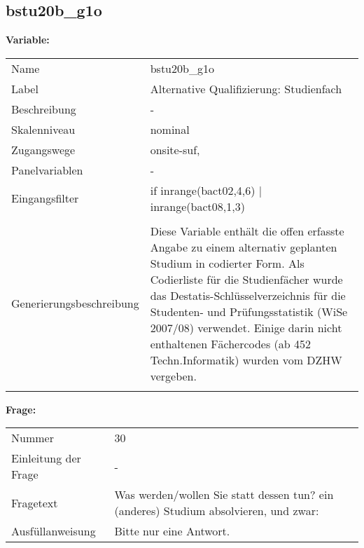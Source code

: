 	
	
	\subsection{bstu20b\_g1o}
	\label{subSection:bstu20b_g1o}

	\noindent\textbf{Variable:}\\
		\begin{tabular}{lL{11.3cm}}
			\label{tableVariable:bstu20b_g1o}
			Name & bstu20b\_g1o \\
			Label & Alternative Qualifizierung: Studienfach \\
			Beschreibung & - \\
			Skalenniveau & nominal \\
			Zugangswege &
				onsite-suf,
 \\
			Panelvariablen & -
			 \\
			Eingangsfilter & if inrange(bact02,4,6) | inrange(bact08,1,3) \\
 \\
					Generierungsbeschreibung & Diese Variable enthält die offen erfasste Angabe zu einem alternativ geplanten Studium in codierter Form. Als Codierliste für die Studienfächer wurde das Destatis-Schlüsselverzeichnis für die Studenten- und Prüfungsstatistik (WiSe 2007/08) verwendet. Einige darin nicht enthaltenen Fächercodes (ab 452 Techn.Informatik) wurden vom DZHW vergeben.
				 \\	
			 \\
		\end{tabular}

		\vspace*{1 cm}
		\noindent\textbf{Frage:}\\
		\begin{tabular}{lL{11.3cm}}
			\label{tableQuestion:bstu20b_g1o}
			Nummer & 30 \\
			Einleitung der Frage & - \\
			Fragetext & Was werden/wollen Sie statt dessen tun?
ein (anderes) Studium absolvieren, und zwar: \\
			Ausfüllanweisung & Bitte nur eine Antwort. \\
		\end{tabular}





